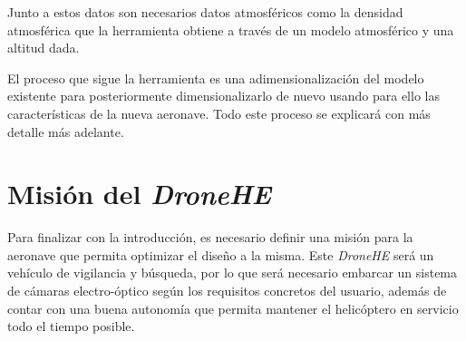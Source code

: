 Junto a estos datos son necesarios datos atmosféricos como la densidad atmosférica que la herramienta obtiene a través de un modelo atmosférico y una altitud dada.

El proceso que sigue la herramienta es una adimensionalización del modelo existente para posteriormente dimensionalizarlo de nuevo usando para ello las características de la nueva aeronave. Todo este proceso se explicará con más detalle más adelante.

\section{Misión del \emph{DroneHE}}

Para finalizar con la introducción, es necesario definir una misión para la aeronave que permita optimizar el diseño a la misma.
Este \emph{DroneHE} será un vehículo de vigilancia y búsqueda, por lo que será necesario embarcar un sistema de cámaras electro-óptico según los requisitos concretos del usuario, además de contar con una buena autonomía que permita mantener el helicóptero en servicio todo el tiempo posible.

